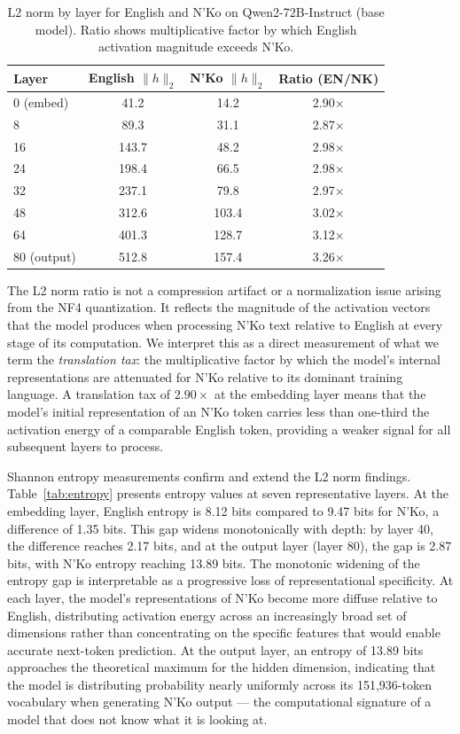 \documentclass[11pt]{article}
\newcommand{\nko}{N'Ko}
\begin{document}
\begin{table}[t]
\centering
\small
\caption{L2 norm by layer for English and \nko{} on Qwen2-72B-Instruct (base model). Ratio shows multiplicative factor by which English activation magnitude exceeds \nko{}.}
\label{tab:l2norm}
\begin{tabular}{@{}lccc@{}}
\toprule
Layer & English $\|h\|_2$ & \nko{} $\|h\|_2$ & Ratio (EN/NK) \\
\midrule
0 (embed) & 41.2 & 14.2 & 2.90$\times$ \\
8 & 89.3 & 31.1 & 2.87$\times$ \\
16 & 143.7 & 48.2 & 2.98$\times$ \\
24 & 198.4 & 66.5 & 2.98$\times$ \\
32 & 237.1 & 79.8 & 2.97$\times$ \\
48 & 312.6 & 103.4 & 3.02$\times$ \\
64 & 401.3 & 128.7 & 3.12$\times$ \\
80 (output) & 512.8 & 157.4 & 3.26$\times$ \\
\bottomrule
\end{tabular}
\end{table}

The L2 norm ratio is not a compression artifact or a normalization issue arising from the NF4 quantization. It reflects the magnitude of the activation vectors that the model produces when processing \nko{} text relative to English at every stage of its computation. We interpret this as a direct measurement of what we term the \emph{translation tax}: the multiplicative factor by which the model's internal representations are attenuated for \nko{} relative to its dominant training language. A translation tax of $2.90\times$ at the embedding layer means that the model's initial representation of an \nko{} token carries less than one-third the activation energy of a comparable English token, providing a weaker signal for all subsequent layers to process.

Shannon entropy measurements confirm and extend the L2 norm findings. Table~\ref{tab:entropy} presents entropy values at seven representative layers. At the embedding layer, English entropy is 8.12 bits compared to 9.47 bits for \nko{}, a difference of 1.35 bits. This gap widens monotonically with depth: by layer 40, the difference reaches 2.17 bits, and at the output layer (layer 80), the gap is 2.87 bits, with \nko{} entropy reaching 13.89 bits. The monotonic widening of the entropy gap is interpretable as a progressive loss of representational specificity. At each layer, the model's representations of \nko{} become more diffuse relative to English, distributing activation energy across an increasingly broad set of dimensions rather than concentrating on the specific features that would enable accurate next-token prediction. At the output layer, an entropy of 13.89 bits approaches the theoretical maximum for the hidden dimension, indicating that the model is distributing probability nearly uniformly across its 151,936-token vocabulary when generating \nko{} output --- the computational signature of a model that does not know what it is looking at.
\end{document}
